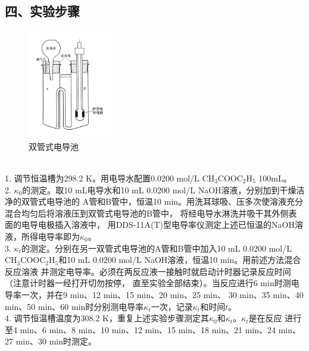 \documentclass[a4paper]{ctexart}
\begin{document}
	\subsection*{四、实验步骤}\par
		\begin{figure}
			\centering
			\includegraphics[width=10em]{1.jpeg}
			\caption{双管式电导池}
		\end{figure}
		\  \\
		1. 调节恒温槽为298.2 K。用电导水配置0.0200 mol/L CH$_3$COOC$_2$H$_5$ 100mL。\\[6pt]
		2. $\kappa_0$的测定。取10 mL电导水和10 mL 0.0200 mol/L NaOH溶液，分别加到干燥洁净的双管式电导池的
		A管和B管中，恒温10 min。用洗耳球吸、压多次使溶液充分混合均匀后将溶液压到双管式电导池的B管中，
		将经电导水淋洗并吸干其外侧表面的电导电极插入溶液中，
		用DDS-11A(T)型电导率仪测定上述已恒温的NaOH溶液，所得电导率即为$\kappa_0$。\\[6pt]
		3. $\kappa_t$的测定。分别在另一双管式电导池的A管和B管中加入10 mL 0.0200 mol/L
		CH$_3$COOC$_2$H$_5$和10 mL 0.0200 mol/L NaOH溶液，恒温10 min。用前述方法混合反应溶液
		并测定电导率。必须在两反应液一接触时就启动计时器记录反应时间（注意计时器一经打开切勿按停，
		直至实验全部结束）。当反应进行6 min时测电导率一次，并在9 min、12 min、15 min、20 min、25 min、
		30 min、35 min、40 min、50 min、60 min时分别测电导率$\kappa_t$一次，记录$\kappa_t$和时间$t$。\\[6pt]
		4. 调节恒温槽温度为308.2 K，重复上述实验步骤测定其$\kappa_0$和$\kappa_t$。$\kappa_t$是在反应
		进行至4 min、6 min、8 min、10 min、12 min、15 min、18 min、21 min、24 min、27 min、30 min时测定。
		
		
\end{document}
